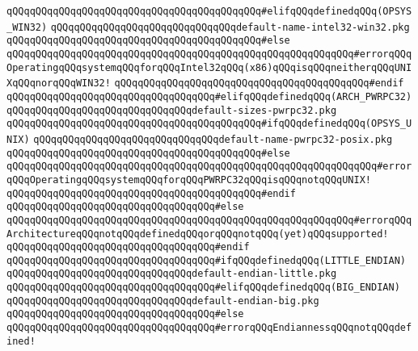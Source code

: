 \verb|qQQqqQQqqQQqqQQqqQQqqQQqqQQqqQQqqQQqqQQqqQQq#elifqQQqdefinedqQQq(OPSYS_WIN32)|\newline
\verb|qQQqqQQqqQQqqQQqqQQqqQQqqQQqqQQqdefault-name-intel32-win32.pkg|\newline
\verb|qQQqqQQqqQQqqQQqqQQqqQQqqQQqqQQqqQQqqQQqqQQq#else|\newline
\verb|qQQqqQQqqQQqqQQqqQQqqQQqqQQqqQQqqQQqqQQqqQQqqQQqqQQqqQQqqQQq#errorqQQqOperatingqQQqsystemqQQqforqQQqIntel32qQQq(x86)qQQqisqQQqneitherqQQqUNIXqQQqnorqQQqWIN32!|\newline
\verb|qQQqqQQqqQQqqQQqqQQqqQQqqQQqqQQqqQQqqQQqqQQq#endif|\newline
\verb|qQQqqQQqqQQqqQQqqQQqqQQqqQQqqQQqqQQq#elifqQQqdefinedqQQq(ARCH_PWRPC32)|\newline
\verb|qQQqqQQqqQQqqQQqqQQqqQQqqQQqqQQqdefault-sizes-pwrpc32.pkg|\newline
\verb|qQQqqQQqqQQqqQQqqQQqqQQqqQQqqQQqqQQqqQQqqQQq#ifqQQqdefinedqQQq(OPSYS_UNIX)|\newline
\verb|qQQqqQQqqQQqqQQqqQQqqQQqqQQqqQQqdefault-name-pwrpc32-posix.pkg|\newline
\verb|qQQqqQQqqQQqqQQqqQQqqQQqqQQqqQQqqQQqqQQqqQQq#else|\newline
\verb|qQQqqQQqqQQqqQQqqQQqqQQqqQQqqQQqqQQqqQQqqQQqqQQqqQQqqQQqqQQqqQQq#errorqQQqOperatingqQQqsystemqQQqforqQQqPWRPC32qQQqisqQQqnotqQQqUNIX!|\newline
\verb|qQQqqQQqqQQqqQQqqQQqqQQqqQQqqQQqqQQqqQQqqQQq#endif|\newline
\verb|qQQqqQQqqQQqqQQqqQQqqQQqqQQqqQQqqQQq#else|\newline
\verb|qQQqqQQqqQQqqQQqqQQqqQQqqQQqqQQqqQQqqQQqqQQqqQQqqQQqqQQqqQQq#errorqQQqArchitectureqQQqnotqQQqdefinedqQQqorqQQqnotqQQq(yet)qQQqsupported!|\newline
\verb|qQQqqQQqqQQqqQQqqQQqqQQqqQQqqQQqqQQq#endif|\newline
\newline
\verb|qQQqqQQqqQQqqQQqqQQqqQQqqQQqqQQqqQQq#ifqQQqdefinedqQQq(LITTLE_ENDIAN)|\newline
\verb|qQQqqQQqqQQqqQQqqQQqqQQqqQQqqQQqdefault-endian-little.pkg|\newline
\verb|qQQqqQQqqQQqqQQqqQQqqQQqqQQqqQQqqQQq#elifqQQqdefinedqQQq(BIG_ENDIAN)|\newline
\verb|qQQqqQQqqQQqqQQqqQQqqQQqqQQqqQQqdefault-endian-big.pkg|\newline
\verb|qQQqqQQqqQQqqQQqqQQqqQQqqQQqqQQqqQQq#else|\newline
\verb|qQQqqQQqqQQqqQQqqQQqqQQqqQQqqQQqqQQq#errorqQQqEndiannessqQQqnotqQQqdefined!|\newline
